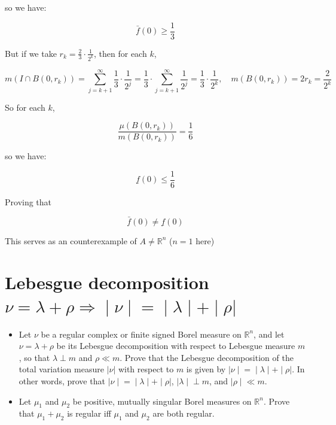 \documentclass{qlnotes-export}
\begin{document}
\begin{example}
so we have:

\[\bar{f}(0) \geq \frac{1}{3}\]

But if we take \(r_{k} = \frac{2}{3} \cdot \frac{1}{2^{k}}\), then for each \(k\),

\[m(I \cap B(0,r_{k})) = \sum\limits_{j = k + 1}^{\infty}\frac{1}{3} \cdot \frac{1}{2^{j}} = \frac{1}{3} \cdot \sum\limits_{j = k + 1}^{\infty}\frac{1}{2^{j}} = \frac{1}{3} \cdot \frac{1}{2^{k}},\quad m(B\left( {0,r_{k}} \right)) = 2r_{k} = \frac{2}{2^{k}}\]

So for each \(k\),

\[\frac{\mu(B(0,r_{k}))}{m(B(0,r_{k}))} = \frac{1}{6}\]

so we have:

\[\underset{¯}{f}(0) \leq \frac{1}{6}\]

Proving that

\[\bar{f}(0) \neq \underset{¯}{f}(0)\]

This serves as an counterexample of \(A \neq {\mathbb{R}}^{n}\) (\(n = 1\) here)

\end{example}

\section{\texorpdfstring{Lebesgue decomposition \(\left. \nu = \lambda + \rho\Longrightarrow \middle| \nu \middle| = \middle| \lambda \middle| + \middle| \rho| \right.\)}{Lebesgue decomposition \textbackslash left. \textbackslash nu = \textbackslash lambda + \textbackslash rho\textbackslash Longrightarrow \textbackslash middle\textbar{} \textbackslash nu \textbackslash middle\textbar{} = \textbackslash middle\textbar{} \textbackslash lambda \textbackslash middle\textbar{} + \textbackslash middle\textbar{} \textbackslash rho\textbar{} \textbackslash right.}}\label{lebesgue-decomposition-nulambdarhoimplies-nulambdarho}

\begin{itemize}
\item
  Let \(\nu\) be a regular complex or finite signed Borel measure on \({\mathbb{R}}^{n}\), and let \(\nu = \lambda + \rho\) be its Lebesgue decomposition with respect to Lebesgue measure \(m\), so that \(\lambda \perp m\) and \(\rho \ll m\). Prove that the Lebesgue decomposition of the total variation measure \(|\nu|\) with respect to \(m\) is given by \(\left. |\nu \middle| = \middle| \lambda \middle| + \middle| \rho| \right.\). In other words, prove that \(\left. |\nu \middle| = \middle| \lambda \middle| + \middle| \rho| \right.\), \(\left. |\lambda \middle| \perp m \right.\), and \(\left. |\rho \middle| \ll m \right.\).
\item
  Let \(\mu_{1}\) and \(\mu_{2}\) be positive, mutually singular Borel measures on \({\mathbb{R}}^{n}\). Prove that \(\mu_{1} + \mu_{2}\) is regular iff \(\mu_{1}\) and \(\mu_{2}\) are both regular.
\end{itemize}
\end{document}
